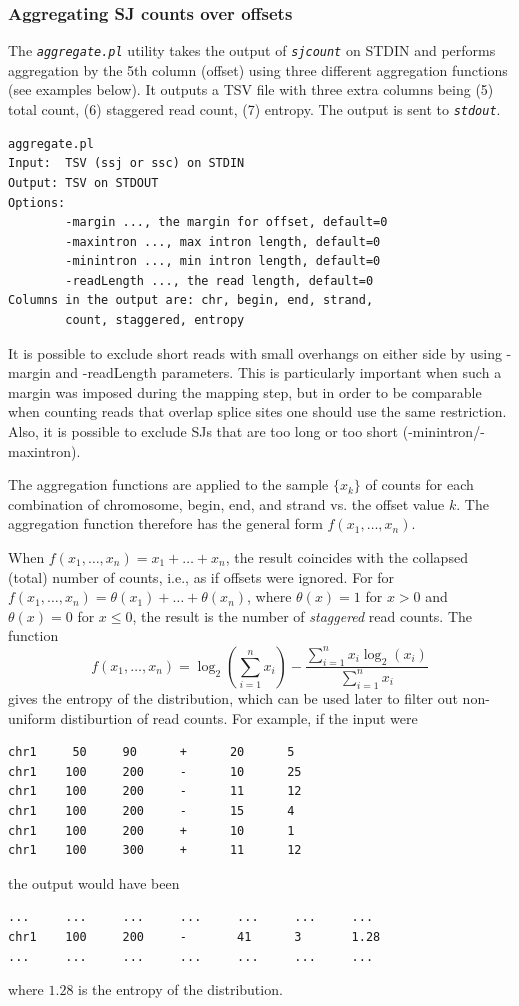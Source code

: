 \documentclass{article}
\newcommand{\prog}[1]{{\tt\em #1}}
\begin{document}

\subsubsection{Aggregating SJ counts over offsets}
The \prog{aggregate.pl} utility takes the output of \prog{sjcount} on STDIN and performs aggregation by the 5th column (offset) using three different aggregation functions 
(see examples below). It outputs a TSV file with three extra columns being (5) total count, (6) staggered read count, (7) entropy. The output is sent to \prog{stdout}. 
\begin{verbatim}
aggregate.pl   
Input:  TSV (ssj or ssc) on STDIN
Output: TSV on STDOUT
Options:
        -margin ..., the margin for offset, default=0
        -maxintron ..., max intron length, default=0
        -minintron ..., min intron length, default=0
        -readLength ..., the read length, default=0
Columns in the output are: chr, begin, end, strand, 
        count, staggered, entropy
\end{verbatim}
It is possible to exclude short reads with small overhangs on either side by using -margin and -readLength parameters. This is particularly important when such a margin 
was imposed during the mapping step, but in order to be comparable when counting reads that overlap splice sites one should use the same restriction. Also, it is possible 
to exclude SJs that are too long or too short (-minintron/-maxintron).

The aggregation functions are applied to the sample $\{x_k\}$ of counts for each combination of chromosome, begin, end, and strand vs. the offset value $k$. 
The aggregation function therefore has the general form $f(x_1,\dots,x_n)$. 

When $f(x_1,\dots,x_n) = x_1+\dots+x_n$, the result coincides with the collapsed (total) number of counts, i.e., as if offsets were ignored.
For for $f(x_1,\dots,x_n) = \theta(x_1)+\dots+\theta(x_n)$, where $\theta(x)=1$ for $x>0$ and $\theta(x)=0$ for $x\le0$, the result is the 
number of {\em staggered} read counts. The function 
$$f(x_1,\dots,x_n) = \log_2(\sum\limits_{i=1}^nx_i) - \frac{\sum\limits_{i=1}^nx_i\log_2(x_i)}{\sum\limits_{i=1}^nx_i}$$ 
gives the entropy of the distribution, which can be used later to filter out non-uniform distiburtion of read counts. 
For example, if the input were
\begin{verbatim}
chr1     50     90      +      20      5
chr1    100     200     -      10      25
chr1    100     200     -      11      12
chr1    100     200     -      15      4
chr1    100     200     +      10      1
chr1    100     300     +      11      12
\end{verbatim}
the output would have been
\begin{verbatim}
...     ...     ...     ...     ...     ...     ...
chr1    100     200     -       41      3       1.28
...     ...     ...     ...     ...     ...     ...
\end{verbatim}
where $1.28$ is the entropy of the distribution.
\end{document}
